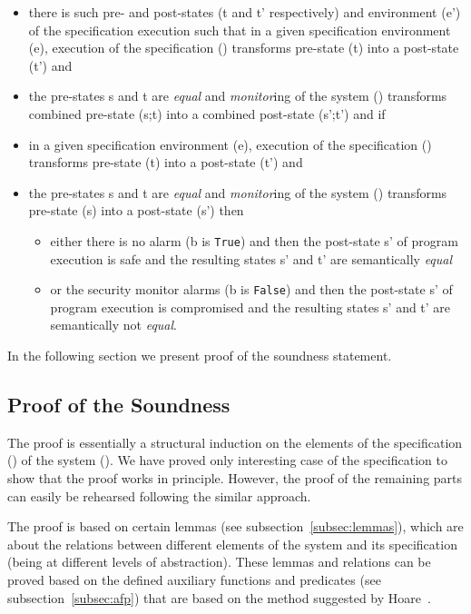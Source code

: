 \documentclass[conference]{IEEEtran}
\begin{document}
\begin{itemize}
\item there is such pre- and post-states (t and t' respectively) and environment (e') of the specification execution such that in a given specification environment (e), execution of the specification () transforms pre-state (t) into a post-state (t') and
\item the pre-states s and t are \emph{equal} and \emph{monitor}ing of the system () transforms combined pre-state (s;t) into a combined post-state (s';t') and if
\item in a given specification environment (e), execution of the specification () transforms pre-state (t) into a post-state (t') and
\item the pre-states s and t are \emph{equal} and \emph{monitor}ing of the system () transforms pre-state (s) into a post-state (s') then
\begin{itemize}
\item either there is no alarm (b is \texttt{True}) and then the post-state s' of program execution is safe and the resulting states s' and t' are semantically \emph{equal}
\item or the security monitor alarms (b is \texttt{False}) and then the post-state s' of program execution is compromised and the resulting states s' and t' are semantically not \emph{equal}.
\end{itemize}
\end{itemize}

In the following section we present proof of the soundness statement.
\subsection{Proof of the Soundness}
The proof is essentially a structural induction on the elements of the specification () of the system (). We have proved only interesting case  of the specification to show that the proof works in principle. However, the proof of the remaining parts can easily be rehearsed following the similar approach. 

The proof is based on certain lemmas (see subsection~\ref{subsec:lemmas}), which are about the relations between different elements of the system and its specification (being at different levels of abstraction). These lemmas and relations can be proved based on the defined auxiliary functions and predicates (see subsection~\ref{subsec:afp}) that are based on the method suggested by Hoare~\cite{Hoare72}. 
\end{document}

